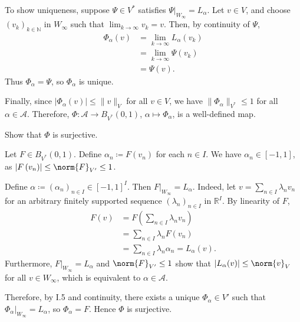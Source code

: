 \documentclass[10pt]{mypackage}
\renewcommand{\coloneq}{\coloneqq}
\begin{document}
\begin{solution}
To show uniqueness, suppose $\Psi \in V^{\ast}$ satisfies $\Psi|_{W_{\infty}} = L_{\alpha}$. Let $v \in V$, and choose $(v_{k})_{k \in \mathbb{N}}$ in $W_{\infty}$ such that $\lim_{k \to \infty} v_{k} = v$. Then, by continuity of $\Psi$,
\begin{align*}
  \Phi_{\alpha}(v) &= \lim_{k \to \infty} L_{\alpha}\left(v_{k}\right)\\
                   &= \lim_{k \to \infty} \Psi\left(v_{k}\right)\\
                   &= \Psi(v). 
\end{align*}
Thus $\Phi_{\alpha} = \Psi$, so $\Phi_{\alpha}$ is unique.

Finally, since $|\Phi_{\alpha}(v)| \le \|v\|_{V}$ for all $v \in V$, we have $\|\Phi_{\alpha}\|_{V^{\ast}} \le 1$ for all $\alpha \in \mathcal{A}$. Therefore, $\Phi : \mathcal{A} \to B_{V^{\ast}}(0,1)$, $\alpha \mapsto \Phi_{\alpha}$, is a well-defined map.
\end{solution}
\begin{problem}[Problem I.6]
  Show that $\Phi$ is surjective.
\end{problem}
\begin{solution}
  Let $F \in B_{V^{\ast}}(0,1)$. Define $\alpha_{n} \coloneq F\left(v_{n}\right)$ for each $n \in I$. We have $\alpha_{n} \in [-1,1]$, as $\left\vert F\left(v_{n}\right) \right\vert \le \norm{F}_{V'} \le 1$.

Define $\alpha \coloneq \left(\alpha_{n}\right)_{n \in I} \in [-1,1]^{I}$. Then $F|_{W_{\infty}} = L_{\alpha}$. Indeed, let $v = \sum_{n \in I} \lambda_{n} v_{n}$ for an arbitrary finitely supported sequence $\left(\lambda_{n}\right)_{n \in I}$ in $\mathbb{R}^{I}$. By linearity of $F$,
\begin{align*}
  F(v) &= F\left(\sum_{n \in I} \lambda_{n} v_{n}\right)\\
       &= \sum_{n \in I} \lambda_{n} F(v_{n})\\
       &= \sum_{n \in I} \lambda_{n} \alpha_{n} = L_{\alpha}(v). 
\end{align*}
Furthermore, $F|_{W_{\infty}} = L_{\alpha}$ and $\norm{F}_{V'} \le 1$ show that $\left\vert L_{\alpha}(v)\right\vert \le \norm{v}_{V}$ for all $v \in W_{\infty}$, which is equivalent to $\alpha \in \mathcal{A}$.

Therefore, by I.5 and continuity, there exists a unique $\Phi_{\alpha} \in V'$ such that $\Phi_{\alpha}|_{W_{\infty}} = L_{\alpha}$, so $\Phi_{\alpha} = F$. Hence $\Phi$ is surjective.
\end{solution}
\end{document}
